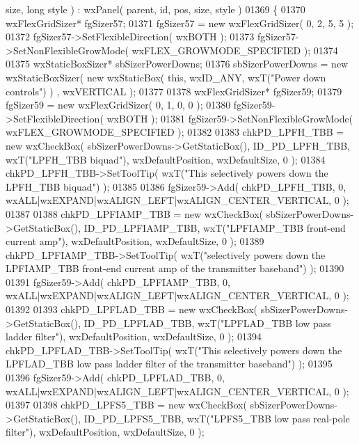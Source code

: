 \begin{DoxyCode}
      size, \textcolor{keywordtype}{long} style ) : wxPanel( parent, id, pos, size, style )
01369 \{
01370     wxFlexGridSizer* fgSizer57;
01371     fgSizer57 = \textcolor{keyword}{new} wxFlexGridSizer( 0, 2, 5, 5 );
01372     fgSizer57->SetFlexibleDirection( wxBOTH );
01373     fgSizer57->SetNonFlexibleGrowMode( wxFLEX\_GROWMODE\_SPECIFIED );
01374     
01375     wxStaticBoxSizer* sbSizerPowerDowns;
01376     sbSizerPowerDowns = \textcolor{keyword}{new} wxStaticBoxSizer( \textcolor{keyword}{new} wxStaticBox( \textcolor{keyword}{this}, wxID\_ANY, wxT(\textcolor{stringliteral}{"Power down controls"}) )
      , wxVERTICAL );
01377     
01378     wxFlexGridSizer* fgSizer59;
01379     fgSizer59 = \textcolor{keyword}{new} wxFlexGridSizer( 0, 1, 0, 0 );
01380     fgSizer59->SetFlexibleDirection( wxBOTH );
01381     fgSizer59->SetNonFlexibleGrowMode( wxFLEX\_GROWMODE\_SPECIFIED );
01382     
01383     chkPD_LPFH_TBB = \textcolor{keyword}{new} wxCheckBox( sbSizerPowerDowns->GetStaticBox(), 
      ID_PD_LPFH_TBB, wxT(\textcolor{stringliteral}{"LPFH\_TBB biquad"}), wxDefaultPosition, wxDefaultSize, 0 );
01384     chkPD_LPFH_TBB->SetToolTip( wxT(\textcolor{stringliteral}{"This selectively powers down the LPFH\_TBB biquad"}) );
01385     
01386     fgSizer59->Add( chkPD_LPFH_TBB, 0, wxALL|wxEXPAND|wxALIGN\_LEFT|wxALIGN\_CENTER\_VERTICAL, 0 );
01387     
01388     chkPD_LPFIAMP_TBB = \textcolor{keyword}{new} wxCheckBox( sbSizerPowerDowns->GetStaticBox(), 
      ID_PD_LPFIAMP_TBB, wxT(\textcolor{stringliteral}{"LPFIAMP\_TBB front-end current amp"}), wxDefaultPosition, wxDefaultSize, 0 );
01389     chkPD_LPFIAMP_TBB->SetToolTip( wxT(\textcolor{stringliteral}{"selectively powers down the LPFIAMP\_TBB front-end current amp of
       the transmitter baseband"}) );
01390     
01391     fgSizer59->Add( chkPD_LPFIAMP_TBB, 0, wxALL|wxEXPAND|wxALIGN\_LEFT|wxALIGN\_CENTER\_VERTICAL, 0 );
01392     
01393     chkPD_LPFLAD_TBB = \textcolor{keyword}{new} wxCheckBox( sbSizerPowerDowns->GetStaticBox(), 
      ID_PD_LPFLAD_TBB, wxT(\textcolor{stringliteral}{"LPFLAD\_TBB low pass ladder filter"}), wxDefaultPosition, wxDefaultSize, 0 );
01394     chkPD_LPFLAD_TBB->SetToolTip( wxT(\textcolor{stringliteral}{"This selectively powers down the LPFLAD\_TBB low pass ladder filter
       of the transmitter baseband"}) );
01395     
01396     fgSizer59->Add( chkPD_LPFLAD_TBB, 0, wxALL|wxEXPAND|wxALIGN\_LEFT|wxALIGN\_CENTER\_VERTICAL, 0 );
01397     
01398     chkPD_LPFS5_TBB = \textcolor{keyword}{new} wxCheckBox( sbSizerPowerDowns->GetStaticBox(), 
      ID_PD_LPFS5_TBB, wxT(\textcolor{stringliteral}{"LPFS5\_TBB low pass real-pole filter"}), wxDefaultPosition, wxDefaultSize, 0 );

\end{DoxyCode}
